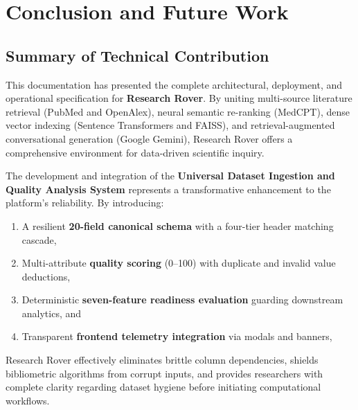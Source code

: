 \section{Conclusion and Future Work}
\label{sec:conclusion}

\subsection{Summary of Technical Contribution}
This documentation has presented the complete architectural, deployment, and operational specification for \textbf{Research Rover}. By uniting multi-source literature retrieval (PubMed and OpenAlex), neural semantic re-ranking (MedCPT), dense vector indexing (Sentence Transformers and FAISS), and retrieval-augmented conversational generation (Google Gemini), Research Rover offers a comprehensive environment for data-driven scientific inquiry.

The development and integration of the \textbf{Universal Dataset Ingestion and Quality Analysis System} represents a transformative enhancement to the platform's reliability. By introducing:
\begin{enumerate}
    \item A resilient \textbf{20-field canonical schema} with a four-tier header matching cascade,
    \item Multi-attribute \textbf{quality scoring} (0--100) with duplicate and invalid value deductions,
    \item Deterministic \textbf{seven-feature readiness evaluation} guarding downstream analytics, and
    \item Transparent \textbf{frontend telemetry integration} via modals and banners,
\end{enumerate}
Research Rover effectively eliminates brittle column dependencies, shields bibliometric algorithms from corrupt inputs, and provides researchers with complete clarity regarding dataset hygiene before initiating computational workflows.

